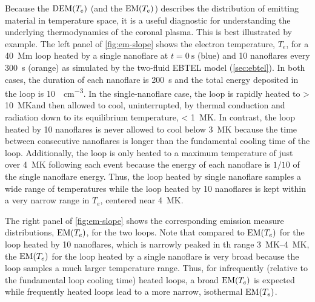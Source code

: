 Because the $\textup{DEM}(T_e)$ (and the $\textup{EM}(T_e)$) describes the distribution of emitting material in temperature space, it is a useful diagnostic for understanding the underlying thermodynamics of the coronal plasma. This is best illustrated by example. The left panel of \autoref{fig:em-slope} shows the electron temperature, $T_e$, for a \SI{40}{\mega\m} loop heated by a single nanoflare at $t=\SI{0}{\second}$ (blue) and 10 nanoflares every \SI{300}{\second} (orange) as simulated by the two-fluid EBTEL model (\autoref{sec:ebtel}). In both cases, the duration of each nanoflare is \SI{200}{\second} and the total energy deposited in the loop is \SI{10}{\erg\per\cubic\cm}. In the single-nanoflare case, the loop is rapidly heated to \SI{> 10}{\mega\kelvin}and then allowed to cool, uninterrupted, by thermal conduction and radiation down to its equilibrium temperature, \SI{< 1}{\mega\kelvin}. In contrast, the loop heated by 10 nanoflares is never allowed to cool below \SI{3}{\mega\kelvin} because the time between consecutive nanoflares is longer than the fundamental cooling time of the loop. Additionally, the loop is only heated to a maximum temperature of just over \SI{4}{\mega\kelvin} following each event because the energy of each nanoflare is $1/10$ of the single nanoflare energy. Thus, the loop heated by single nanoflare samples a wide range of temperatures while the loop heated by 10 nanoflares is kept within a very narrow range in $T_e$, centered near \SI{4}{\mega\kelvin}.

The right panel of \autoref{fig:em-slope} shows the corresponding emission measure distributions, $\textup{EM}(T_e)$, for the two loops. Note that compared to $\textup{EM}(T_e)$ for the loop heated by 10 nanoflares, which is narrowly peaked in th range \SIrange{3}{4}{\mega\kelvin}, the $\textup{EM}(T_e)$ for the loop heated by a single nanoflare is very broad because the loop samples a much larger temperature range. Thus, for infrequently (relative to the fundamental loop cooling time) heated loops, a broad $\textup{EM}(T_e)$ is expected while frequently heated loops lead to a more narrow, isothermal $\textup{EM}(T_e)$.

